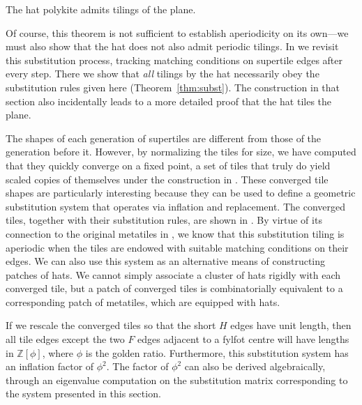 \begin{theorem}
\label{thm:subst_tiling}
	The hat polykite admits tilings of the plane.
\end{theorem}

Of course, this theorem is not sufficient to establish aperiodicity
on its own---we must also show that the hat does not also admit
periodic tilings.  In  we revisit this
substitution process, tracking matching conditions on supertile edges
after every step.  There we show that \textit{all} tilings by the 
hat necessarily obey the substitution rules given here
(Theorem~\ref{thm:subst}).  The construction in that section also
incidentally leads to a more detailed proof that the hat tiles the plane.

The shapes of each generation of supertiles are different from those
of the generation before it.  However, by normalizing the tiles for
size, we have computed that they quickly converge on a fixed point, a 
set of tiles that truly do yield scaled copies of themselves under the
construction in .  These converged tile
shapes are particularly interesting because they can be used to define a 
geometric substitution system that operates via inflation and replacement.
The converged tiles, together with
their substitution rules, are shown in .
By virtue of its connection to the original metatiles in
, we know that this substitution tiling is aperiodic
when the tiles are endowed with suitable matching conditions on their
edges.  We can also use this system as an alternative means of constructing 
patches of hats.  We cannot simply associate a cluster of hats rigidly with
each converged tile, but a patch of converged tiles is combinatorially
equivalent to a corresponding patch of metatiles, which are
equipped with hats.

If we rescale the converged tiles so that the short $H$ edges
have unit length, then all tile edges except the two $F$ edges adjacent to
a fylfot centre will have lengths in $\mathbb{Z}[\phi]$, where $\phi$ is the
golden ratio.  Furthermore, this substitution system has an inflation factor
of $\phi^2$.  The factor of $\phi^2$ can also be derived algebraically, 
through an eigenvalue computation on the substitution matrix corresponding to
the system presented in
this section.

